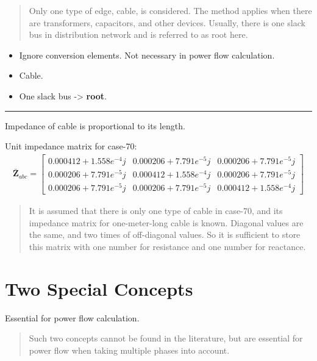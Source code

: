 \documentclass[
]{book}
\providecommand{\tightlist}{%
  \setlength{\itemsep}{0pt}\setlength{\parskip}{0pt}}
\begin{document}
\begin{quote}
Only one type of edge, cable, is considered. The method applies when there
are transformers, capacitors, and other devices. Usually, there is one slack
bus in distribution network and is referred to as root here.
\end{quote}

\begin{itemize}
\tightlist
\item
  Ignore conversion elements. Not necessary in power flow calculation.
\item
  Cable.
\item
  One slack bus -\textgreater{} \textbf{root}.
\end{itemize}

\begin{center}\rule{0.5\linewidth}{0.5pt}\end{center}

Impedance of cable is proportional to its length.

Unit impedance matrix for case-70:
\[ \begin{aligned}
  \boldsymbol{\bar{Z}}_{a b c}
  =
  \left[\begin{array}{lll}
    0.000412+1.558e^{-4} j
    & 0.000206+7.791e^{-5} j
    & 0.000206+7.791e^{-5} j \\
    0.000206+7.791e^{-5} j
    & 0.000412+1.558e^{-4} j
    & 0.000206+7.791e^{-5} j \\
    0.000206+7.791e^{-5} j
    & 0.000206+7.791e^{-5} j
    & 0.000412+1.558e^{-4}j
  \end{array}\right]
  \nonumber
\end{aligned} \]

\begin{quote}
It is assumed that there is only one type of cable in case-70, and its
impedance matrix for one-meter-long cable is known. Diagonal values are the
same, and two times of off-diagonal values. So it is sufficient to store this
matrix with one number for resistance and one number for reactance.
\end{quote}

\hypertarget{concepts}{%
\section{Two Special Concepts}\label{concepts}}

Essential for power flow calculation.

\begin{quote}
Such two concepts cannot be found in the literature, but are essential for
power flow when taking multiple phases into account.
\end{quote}
\end{document}
